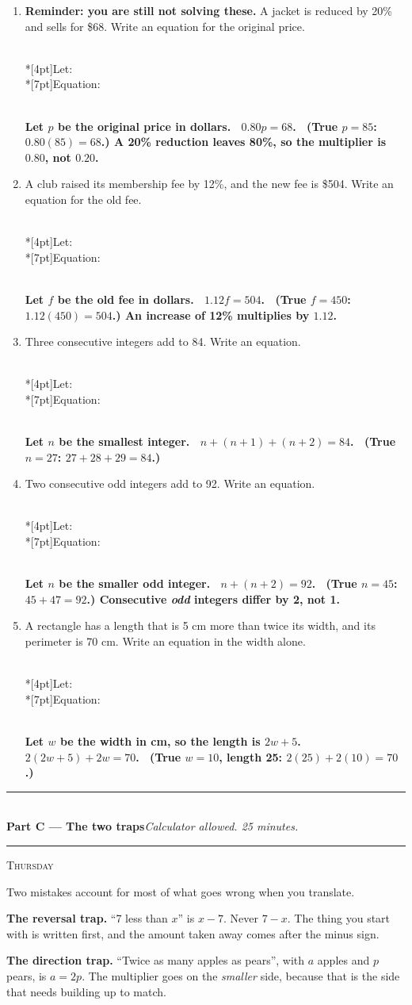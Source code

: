 \documentclass[11pt,a4paper]{article}
\newif\ifANSWERS
\newcommand{\PartHead}[2]{%
  \vspace{6pt}
  {\color{navy}\rule{\textwidth}{0.8pt}}\\[2pt]
  {\large\bfseries\color{navy}#1}\hfill{\small\itshape #2}\\[-4pt]
  {\color{navy}\rule{\textwidth}{0.4pt}}
  \vspace{4pt}
}
\newcommand{\sitting}[1]{{\footnotesize\textsc{\color{navy}#1}}\par\vspace{2pt}}
\newcommand{\ans}[1]{\ {\color{keyred}\bfseries #1}}
\newcommand{\ans}[1]{}
\newcommand{\setuplines}{%
  \ifANSWERS\else
  \\*[4pt]\hspace*{4pt}Let: \underline{\hspace{0.80\linewidth}}%
  \\*[7pt]\hspace*{4pt}Equation: \underline{\hspace{0.72\linewidth}}%
  \fi
}
\begin{document}
\begin{enumerate}[leftmargin=20pt,itemsep=7pt]
\item \textbf{Reminder: you are still not solving these.} A jacket is reduced by 20\%
  and sells for \$68. Write an equation for the original price.
  \setuplines
  \ans{\\ Let $p$ be the original price in dollars. \ $0.80p=68$. \ (True $p=85$:
  $0.80(85)=68$.) A 20\% reduction leaves 80\%, so the multiplier is $0.80$, not $0.20$.}

\item A club raised its membership fee by 12\%, and the new fee is \$504. Write an
  equation for the old fee.
  \setuplines
  \ans{\\ Let $f$ be the old fee in dollars. \ $1.12f=504$. \ (True $f=450$:
  $1.12(450)=504$.) An increase of 12\% multiplies by $1.12$.}

\item Three consecutive integers add to 84. Write an equation.
  \setuplines
  \ans{\\ Let $n$ be the smallest integer. \ $n+(n+1)+(n+2)=84$. \ (True $n=27$:
  $27+28+29=84$.)}

\item Two consecutive odd integers add to 92. Write an equation.
  \setuplines
  \ans{\\ Let $n$ be the smaller odd integer. \ $n+(n+2)=92$. \ (True $n=45$:
  $45+47=92$.) Consecutive \emph{odd} integers differ by 2, not 1.}

\item A rectangle has a length that is 5 cm more than twice its width, and its
  perimeter is 70 cm. Write an equation in the width alone.
  \setuplines
  \ans{\\ Let $w$ be the width in cm, so the length is $2w+5$.
  \ $2(2w+5)+2w=70$. \ (True $w=10$, length 25: $2(25)+2(10)=70$.)}
\end{enumerate}

\PartHead{Part C --- The two traps}{Calculator allowed. 25 minutes.}
\sitting{Thursday}
Two mistakes account for most of what goes wrong when you translate.

\textbf{The reversal trap.} ``7 less than $x$'' is $x-7$. Never $7-x$. The thing you
start with is written first, and the amount taken away comes after the minus sign.

\textbf{The direction trap.} ``Twice as many apples as pears'', with $a$ apples and
$p$ pears, is $a=2p$. The multiplier goes on the \emph{smaller} side, because that is
the side that needs building up to match.
\end{document}
